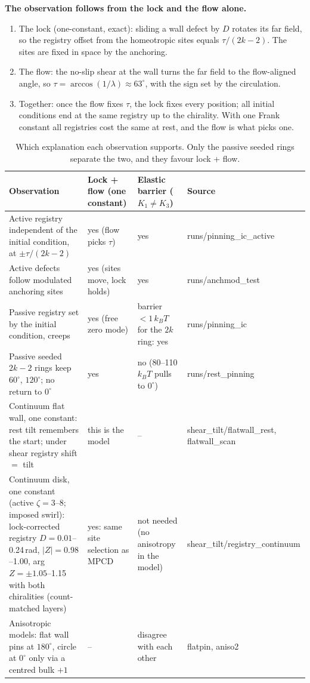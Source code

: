 \documentclass[11pt,a4paper]{article}
\newcommand{\kT}{k_BT}\newcommand{\half}{\tfrac12}\newcommand{\la}{\ell_a}
\begin{document}
\textbf{The observation follows from the lock and the flow alone.}
\begin{enumerate}
\item The lock (one-constant, exact): sliding a wall defect by $D$ rotates its far field, so the registry offset from the homeotropic sites equals
$\tau/(2k-2)$. The sites are fixed in space by the anchoring.
\item The flow: the no-slip shear at the wall turns the far field to the flow-aligned angle, so $\tau=\arccos(1/\lambda)\approx63^\circ$, with the sign
set by the circulation.
\item Together: once the flow fixes $\tau$, the lock fixes every position; all initial conditions end at the same registry up to the chirality.
With one Frank constant all registries cost the same at rest, and the flow is what picks one.
\end{enumerate}

\begin{table}[H]\centering\small
\begin{tabular}{P{5.2cm}P{3.6cm}P{3.4cm}P{3.4cm}}\toprule
Observation & Lock + flow (one constant) & Elastic barrier ($K_1\neq K_3$) & Source\\\midrule
Active registry independent of the initial condition, at $\pm\tau/(2k-2)$ & yes (flow picks $\tau$) & yes & runs/pinning\_ic\_active\\
Active defects follow modulated anchoring sites & yes (sites move, lock holds) & yes & runs/anchmod\_test\\
Passive registry set by the initial condition, creeps & yes (free zero mode) & barrier $<1\,\kT$ for the $2k$ ring: yes & runs/pinning\_ic\\
Passive seeded $2k-2$ rings keep $60^\circ$, $120^\circ$; no return to $0^\circ$ & yes & no (80--110\,$\kT$ pulls to $0^\circ$) & runs/rest\_pinning\\
Continuum flat wall, one constant: rest tilt remembers the start; under shear registry shift $=$ tilt & this is the model & -- & shear\_tilt/flatwall\_rest, flatwall\_scan\\
Continuum disk, one constant (active $\zeta=3$--8; imposed swirl): lock-corrected registry $D=0.01$--0.24\,rad, $|Z|=0.98$--1.00, arg $Z=\pm1.05$--1.15 with both chiralities (count-matched layers) & yes: same site selection as MPCD & not needed (no anisotropy in the model) & shear\_tilt/registry\_continuum\\
Anisotropic models: flat wall pins at $180^\circ$, circle at $0^\circ$ only via a centred bulk $+1$ & -- & disagree with each other & flatpin, aniso2\\\bottomrule
\end{tabular}
\caption{Which explanation each observation supports. Only the passive seeded rings separate the two, and they favour lock + flow.}
\end{table}
\end{document}
